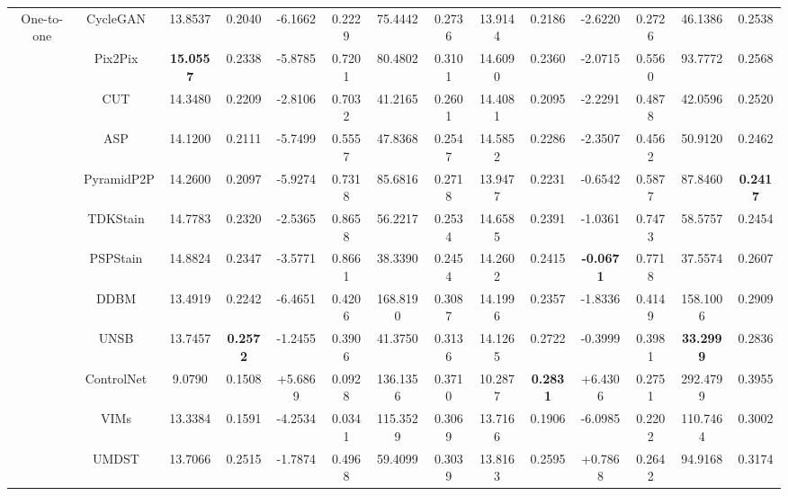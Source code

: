 \documentclass[journal,twoside,web]{ieeecolor}
\begin{document}
\begin{table}[ht]
{\begin{tabular}{c|c|cc|cc|cc|cc|cc|cc}
      \multirow{9}{*}{One-to-one} 
      & CycleGAN~\cite{zhu2017unpaired} & 
      13.8537 & 0.2040 & -6.1662 & 0.2229 & 75.4442 & 0.2736 & 
      13.9144 & 0.2186 & -2.6220 & 0.2726 & 46.1386 & 0.2538 \\
      
      & Pix2Pix~\cite{isola2017image} & 
      \textbf{15.0557} & 0.2338 & -5.8785 & 0.7201 & 80.4802 & 0.3101 & 
      14.6090 & 0.2360 & -2.0715 & 0.5560 & 93.7772 & 0.2568 \\
      
      & CUT~\cite{park2020contrastive} & 
      14.3480 & 0.2209 & -2.8106 & 0.7032 & 41.2165 & 0.2601 & 
      14.4081 & 0.2095 & -2.2291 & 0.4878 & 42.0596 & 0.2520 \\
      
      & ASP~\cite{li2023adaptive} & 
      14.1200 & 0.2111 & -5.7499 & 0.5557 & 47.8368 & 0.2547 & 
      14.5852 & 0.2286 & -2.3507 & 0.4562 & 50.9120 & 0.2462 \\
      
      & PyramidP2P~\cite{liu2022bci} & 
      14.2600 & 0.2097 & -5.9274 & 0.7318 & 85.6816 & 0.2718 & 
      13.9477 & 0.2231 & -0.6542 & 0.5877 & 87.8460 & \textbf{0.2417} \\

      & TDKStain~\cite{peng2024advancing} &
      14.7783 & 0.2320 & -2.5365 & 0.8658 & 56.2217 & 0.2534 &
      14.6585 & 0.2391 & -1.0361 & 0.7473 & 58.5757 & 0.2454 \\
      
      & PSPStain~\cite{chen2024pathological} & 
      14.8824 & 0.2347 & -3.5771 & 0.8661 & 38.3390 & 0.2454 & 
      14.2602 & 0.2415 & \textbf{-0.0671} & 0.7718 & 37.5574 & 0.2607 \\
      
      & DDBM~\cite{zhou2023denoising} &
      13.4919 & 0.2242 & -6.4651 & 0.4206 & 168.8190 & 0.3087 &
      14.1996 & 0.2357 & -1.8336 & 0.4149 & 158.1006 & 0.2909 \\
      
      & UNSB~\cite{kim2023unpaired} &
      13.7457 & \textbf{0.2572} & -1.2455 & 0.3906 & 41.3750 & 0.3136 &
      14.1265 & 0.2722 & -0.3999 & 0.3981 & \textbf{33.2999} & 0.2836 \\
      
       \Xhline{0.8pt}
      \rowcolor{gray!10}
      
      & ControlNet~\cite{zhang2023adding} &
      9.0790 & 0.1508 & +5.6869 & 0.0928 & 136.1356 & 0.3710 &
      10.2877 & \textbf{0.2831} & +6.4306 & 0.2751 & 292.4799 & 0.3955 \\
       \rowcolor{gray!10}
      & VIMs~\cite{dubey2024vims} & 
      13.3384 & 0.1591 & -4.2534 & 0.0341 & 115.3529 & 0.3069 &
      13.7166 & 0.1906 & -6.0985 & 0.2202 & 110.7464 & 0.3002 \\
     \rowcolor{gray!10}
      & UMDST~\cite{lin2022unpaired} & 
      13.7066 & 0.2515 & -1.7874 & 0.4968 & 59.4099 & 0.3039 &
      13.8163 & 0.2595 & +0.7868 & 0.2642 & 94.9168 & 0.3174 \\
     

\end{tabular}}
\end{table}
\end{document}
